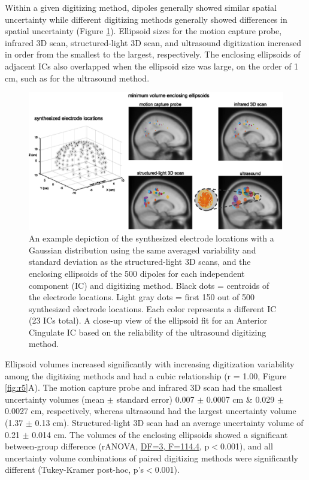 \documentclass[../thesis_seyed.tex]{subfiles}
\begin{document}
Within a given digitizing method, dipoles generally showed similar spatial uncertainty while different digitizing methods generally showed differences in spatial uncertainty (Figure \ref{fig:r4}). Ellipsoid sizes for the motion capture probe, infrared 3D scan, structured-light 3D scan, and ultrasound digitization increased in order from the smallest to the largest, respectively. The enclosing ellipsoids of adjacent ICs also overlapped when the ellipsoid size was large, on the order of 1 cm, such as for the ultrasound method. 

\begin{figure}[bt!]
    \centering
    \includegraphics[width=\linewidth]{../img/result4.eps}
    \caption{An example depiction of the synthesized electrode locations with a Gaussian distribution using the same averaged variability and standard deviation as the structured-light 3D scans, and the enclosing ellipsoids of the 500 dipoles for each independent component (IC) and digitizing method. Black dots = centroids of the electrode locations. Light gray dots = first 150 out of 500 synthesized electrode locations. Each color represents a different IC (23 ICs total). A close-up view of the ellipsoid fit for an Anterior Cingulate IC based on the reliability of the ultrasound digitizing method.}
    \label{fig:r4}
\end{figure}

Ellipsoid volumes increased significantly with increasing digitization variability among the digitizing methods and had a cubic relationship (r = 1.00, Figure \ref{fig:r5}A). The motion capture probe and infrared 3D scan had the smallest uncertainty volumes (mean $\pm$ standard error) 0.007 $\pm$ 0.0007 cm \& 0.029 $\pm$ 0.0027 cm, respectively, whereas ultrasound had the largest uncertainty volume (1.37 $\pm$ 0.13 cm). Structured-light 3D scan had an average uncertainty volume of 0.21 $\pm$ 0.014 cm. The volumes of the enclosing ellipsoids showed a significant between-group difference (rANOVA, \ul{DF=3, F=114.4,} p$<$0.001), and all uncertainty volume combinations of paired digitizing methods were significantly different (Tukey-Kramer post-hoc, p's$<$0.001). 
\end{document}
